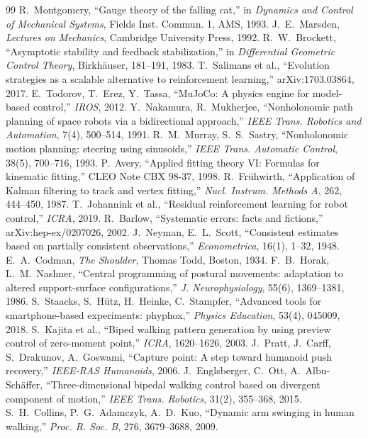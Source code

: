 \documentclass[paper=a4paper,fontsize=10pt,twocolumn,column_gap=2zw,line_length=24zw,number_of_lines=46,head_space=20mm]{jlreq}
\begin{document}
\begin{thebibliography}{99}
 R.~Montgomery, ``Gauge theory of the falling cat,'' in \textit{Dynamics and Control of Mechanical Systems}, Fields Inst. Commun. 1, AMS, 1993.
 J.~E.~Marsden, \textit{Lectures on Mechanics}, Cambridge University Press, 1992.
 R.~W.~Brockett, ``Asymptotic stability and feedback stabilization,'' in \textit{Differential Geometric Control Theory}, Birkhäuser, 181--191, 1983.
 T.~Salimans et al., ``Evolution strategies as a scalable alternative to reinforcement learning,'' arXiv:1703.03864, 2017.
 E.~Todorov, T.~Erez, Y.~Tassa, ``MuJoCo: A physics engine for model-based control,'' \textit{IROS}, 2012.
 Y.~Nakamura, R.~Mukherjee, ``Nonholonomic path planning of space robots via a bidirectional approach,'' \textit{IEEE Trans. Robotics and Automation}, 7(4), 500--514, 1991.
 R.~M.~Murray, S.~S.~Sastry, ``Nonholonomic motion planning: steering using sinusoids,'' \textit{IEEE Trans. Automatic Control}, 38(5), 700--716, 1993.
 P.~Avery, ``Applied fitting theory VI: Formulas for kinematic fitting,'' CLEO Note CBX 98-37, 1998.
 R.~Frühwirth, ``Application of Kalman filtering to track and vertex fitting,'' \textit{Nucl. Instrum. Methods A}, 262, 444--450, 1987.
 T.~Johannink et al., ``Residual reinforcement learning for robot control,'' \textit{ICRA}, 2019.
 R.~Barlow, ``Systematic errors: facts and fictions,'' arXiv:hep-ex/0207026, 2002.
 J.~Neyman, E.~L.~Scott, ``Consistent estimates based on partially consistent observations,'' \textit{Econometrica}, 16(1), 1--32, 1948.
 E.~A.~Codman, \textit{The Shoulder}, Thomas Todd, Boston, 1934.
 F.~B.~Horak, L.~M.~Nashner, ``Central programming of postural movements: adaptation to altered support-surface configurations,'' \textit{J. Neurophysiology}, 55(6), 1369--1381, 1986.
 S.~Staacks, S.~Hütz, H.~Heinke, C.~Stampfer, ``Advanced tools for smartphone-based experiments: phyphox,'' \textit{Physics Education}, 53(4), 045009, 2018.
 S.~Kajita et al., ``Biped walking pattern generation by using preview control of zero-moment point,'' \textit{ICRA}, 1620--1626, 2003.
 J.~Pratt, J.~Carff, S.~Drakunov, A.~Goswami, ``Capture point: A step toward humanoid push recovery,'' \textit{IEEE-RAS Humanoids}, 2006.
 J.~Englsberger, C.~Ott, A.~Albu-Sch\"affer, ``Three-dimensional bipedal walking control based on divergent component of motion,'' \textit{IEEE Trans. Robotics}, 31(2), 355--368, 2015.
 S.~H.~Collins, P.~G.~Adamczyk, A.~D.~Kuo, ``Dynamic arm swinging in human walking,'' \textit{Proc. R. Soc. B}, 276, 3679--3688, 2009.
\end{thebibliography}
\end{document}
